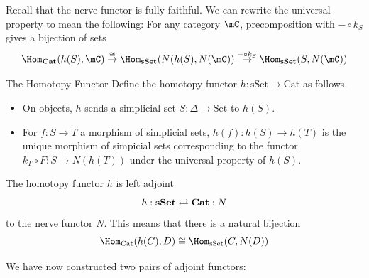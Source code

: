 \documentclass[a4paper]{article}
\begin{document}
Recall that the nerve functor is fully faithful. We can rewrite the universal property to mean the following: For any category $\mC$, precomposition with $-\circ k_S$ gives a bijection of sets $$\Hom_\bold{Cat}(h(S),\mC)\overset{\cong}{\rightarrow}\Hom_\bold{sSet}(N(h(S),N(\mC))\overset{-\circ k_S}{\rightarrow}\Hom_\bold{sSet}(S,N(\mC))$$

\begin{defn}{The Homotopy Functor}{} Define the homotopy functor $h:\text{sSet}\to\text{Cat}$ as follows. 
\begin{itemize}
\item On objects, $h$ sends a simplicial set $S:\Delta\to\text{Set}$ to $h(S)$. 
\item For $f:S\to T$ a morphism of simplicial sets, $h(f):h(S)\to h(T)$ is the unique morphism of simpicial sets corresponding to the functor $k_T\circ F:S\to N(h(T))$ under the universal property of $h(S)$. 
\end{itemize}
\end{defn}

\begin{thm}{}{} The homotopy functor $h$ is left adjoint $$h:\bold{sSet}\rightleftarrows\bold{Cat}:N$$ to the nerve functor $N$. This means that there is a natural bijection $$\Hom_\text{Cat}(h(C),D)\cong\Hom_\text{sSet}(C,N(D))$$
\end{thm}

We have now constructed two pairs of adjoint functors: \\~\\
\\~\\
\end{document}
